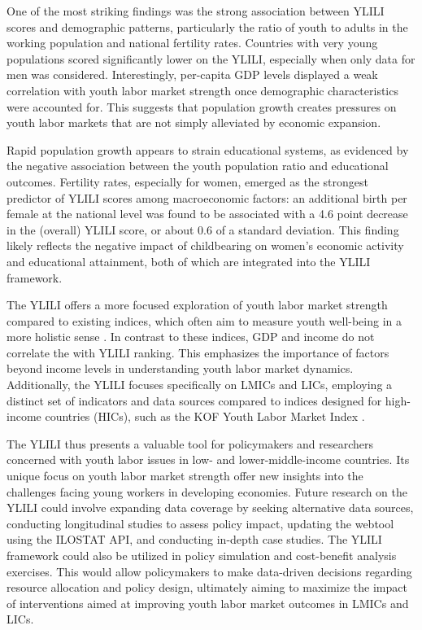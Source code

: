 \documentclass[
  a4paper, twoside, 12pt]{book}
\renewcommand{\hl}[1]{#1}
\begin{document}
\hl{One of the most striking findings was the strong association between YLILI scores and demographic patterns, particularly the ratio of youth to adults in the working population and national fertility rates. Countries with very young populations scored significantly lower on the YLILI, especially when only data for men was considered. Interestingly, per-capita GDP levels displayed a weak correlation with youth labor market strength once demographic characteristics were accounted for. This suggests that population growth creates pressures on youth labor markets that are not simply alleviated by economic expansion.}

\hl{Rapid population growth appears to strain educational systems, as evidenced by the negative association between the youth population ratio and educational outcomes. Fertility rates, especially for women, emerged as the strongest predictor of YLILI scores among macroeconomic factors:  an additional birth per female at the national level was found to be associated with a 4.6 point decrease in the (overall) YLILI score, or about 0.6 of a standard deviation. This finding likely reflects the negative impact of childbearing on women's economic activity and educational attainment, both of which are integrated into the YLILI framework.}

\hl{The YLILI offers a more focused exploration of youth labor market strength compared to existing indices, which often aim to measure youth well-being in a more holistic sense} \autocite{sen2016,lisney2018}. \hl{In contrast to these indices, GDP and income do not correlate the with YLILI ranking. This emphasizes the importance of factors beyond income levels in understanding youth labor market dynamics. Additionally, the YLILI focuses specifically on LMICs and LICs, employing a distinct set of indicators and data sources compared to indices designed for high-income countries (HICs), such as the KOF Youth Labor Market Index }\autocite{renold2014,pusterla2015,pusterla2016}.

\hl{The YLILI thus presents a valuable tool for policymakers and researchers concerned with youth labor issues in low- and lower-middle-income countries. Its unique focus on youth labor market strength offer new insights into the challenges facing young workers in developing economies. Future research on the YLILI could involve expanding data coverage by seeking alternative data sources, conducting longitudinal studies to assess policy impact, updating the webtool using the ILOSTAT API, and conducting in-depth case studies. The YLILI framework could also be utilized in policy simulation and cost-benefit analysis exercises. This would allow policymakers to make data-driven decisions regarding resource allocation and policy design, ultimately aiming to maximize the impact of interventions aimed at improving youth labor market outcomes in LMICs and LICs.}
\end{document}
